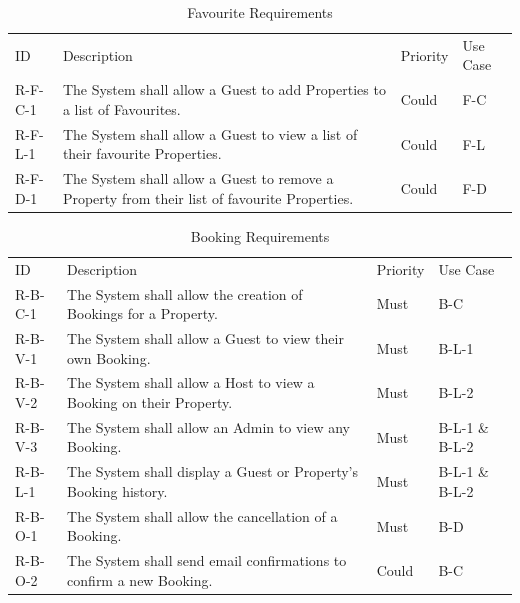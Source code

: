 \begin{table}[H]
    \centering
    \begin{tabular}{| p{1.8cm} | p{9.7cm} | P{1.5cm} | P{2cm} | }
        \hline
          \\ \hline
         ID      & Description & Priority & Use Case \\ \hline
        R-F-C-1 & The System shall allow a Guest to add Properties to a list of Favourites. & Could & F-C \\ \hline
        R-F-L-1 & The System shall allow a Guest to view a list of their favourite Properties. & Could & F-L \\ \hline
        R-F-D-1 & The System shall allow a Guest to remove a Property from their list of favourite Properties. & Could & F-D \\ \hline
    \end{tabular}
    \caption{Favourite Requirements}
    \label{requirements:favourites}
\end{table}

\begin{table}[H]
    \centering
    \begin{tabular}{| p{1.8cm} | p{9.7cm} | P{1.5cm} | P{2cm} | }
        \hline
          \\ \hline
         ID      & Description & Priority & Use Case \\ \hline
        R-B-C-1 & The System shall allow the creation of Bookings for a Property. & Must & B-C \\ \hline
        R-B-V-1 & The System shall allow a Guest to view their own Booking. & Must & B-L-1 \\ \hline
        R-B-V-2 & The System shall allow a Host to view a Booking on their Property. & Must & B-L-2 \\ \hline
        R-B-V-3 & The System shall allow an Admin to view any Booking. & Must & B-L-1 \& B-L-2 \\ \hline
        R-B-L-1 & The System shall display a Guest or Property's Booking history. & Must & B-L-1 \& B-L-2 \\ \hline
        R-B-O-1 & The System shall allow the cancellation of a Booking. & Must & B-D \\ \hline
        R-B-O-2 & The System shall send email confirmations to confirm a new Booking. & Could & B-C \\ \hline
    \end{tabular}
    \caption{Booking Requirements}
    \label{requirements:bookings}
\end{table}

